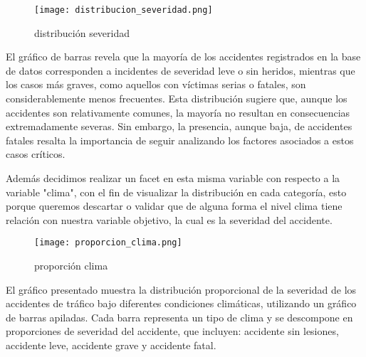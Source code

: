 \documentclass{book}
\begin{document}
\begin{figure}[htbp]
\centering
\texttt{[image: distribucion\_severidad.png]}
\caption{\label{fig:distribución severidad}distribución severidad}
\end{figure}

El gráfico de barras revela que la mayoría de los accidentes registrados en la base de datos corresponden a incidentes de severidad leve o sin heridos, mientras que los casos más graves, como aquellos con víctimas serias o fatales, son considerablemente menos frecuentes. Esta distribución sugiere que, aunque los accidentes son relativamente comunes, la mayoría no resultan en consecuencias extremadamente severas. Sin embargo, la presencia, aunque baja, de accidentes fatales resalta la importancia de seguir analizando los factores asociados a estos casos críticos.

Además decidimos realizar un facet en esta misma variable con respecto a la variable "clima", con el fin de visualizar la distribución en cada categoría, esto porque queremos descartar o validar que de alguna forma el nivel clima tiene relación con nuestra variable objetivo, la cual es la severidad del accidente.

\begin{figure}[htbp]
\centering
\texttt{[image: proporcion\_clima.png]}
\caption{\label{fig:proporción clima}proporción clima}
\end{figure}

El gráfico presentado muestra la distribución proporcional de la severidad de los accidentes de tráfico bajo diferentes condiciones climáticas, utilizando un gráfico de barras apiladas. Cada barra representa un tipo de clima y se descompone en proporciones de severidad del accidente, que incluyen: accidente sin lesiones, accidente leve, accidente grave y accidente fatal.
\end{document}
